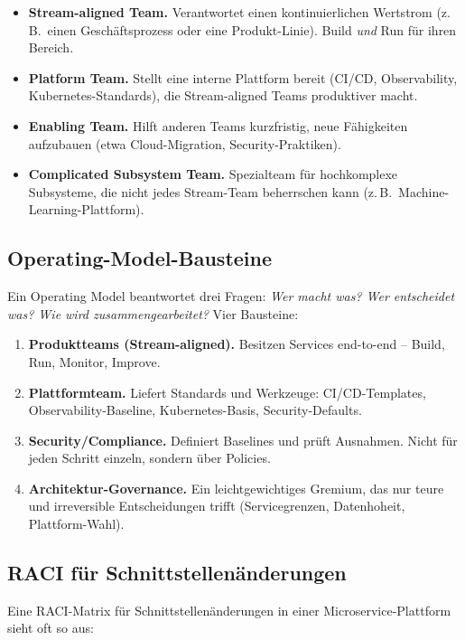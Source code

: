\documentclass[11pt,a4paper,oneside]{article}
\newcommand{\fachbegriff}[1]{\textbf{#1}}
\begin{document}
\begin{itemize}
  \item \fachbegriff{Stream-aligned Team.} Verantwortet einen kontinuierlichen Wertstrom (z.\,B.\ einen Geschäftsprozess oder eine Produkt-Linie). Build \emph{und} Run für ihren Bereich.
  \item \fachbegriff{Platform Team.} Stellt eine interne Plattform bereit (CI/CD, Observability, Kubernetes-Standards), die Stream-aligned Teams produktiver macht.
  \item \fachbegriff{Enabling Team.} Hilft anderen Teams kurzfristig, neue Fähigkeiten aufzubauen (etwa Cloud-Migration, Security-Praktiken).
  \item \fachbegriff{Complicated Subsystem Team.} Spezialteam für hochkomplexe Subsysteme, die nicht jedes Stream-Team beherrschen kann (z.\,B.\ Machine-Learning-Plattform).
\end{itemize}

\subsection{Operating-Model-Bausteine}

Ein Operating Model beantwortet drei Fragen: \emph{Wer macht was? Wer entscheidet was? Wie wird zusammengearbeitet?} Vier Bausteine:

\begin{enumerate}
  \item \textbf{Produktteams (Stream-aligned).} Besitzen Services end-to-end -- Build, Run, Monitor, Improve.
  \item \textbf{Plattformteam.} Liefert Standards und Werkzeuge: CI/CD-Templates, Observability-Baseline, Kubernetes-Basis, Security-Defaults.
  \item \textbf{Security/Compliance.} Definiert Baselines und prüft Ausnahmen. Nicht für jeden Schritt einzeln, sondern über Policies.
  \item \textbf{Architektur-Governance.} Ein leichtgewichtiges Gremium, das nur teure und irreversible Entscheidungen trifft (Servicegrenzen, Datenhoheit, Plattform-Wahl).
\end{enumerate}

\subsection{RACI für Schnittstellenänderungen}

Eine RACI-Matrix für Schnittstellenänderungen in einer Microservice-Plattform sieht oft so aus:
\end{document}
